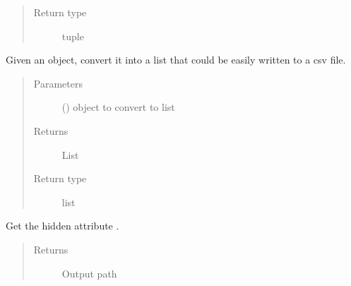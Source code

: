 \documentclass[letterpaper,10pt,english]{sphinxmanual}
\begin{document}
\begin{fulllineitems}
\begin{fulllineitems}
\begin{quote}
\begin{description}
\item[{Return type}] \leavevmode
tuple

\end{description}\end{quote}

\end{fulllineitems}


\begin{fulllineitems}
\label{\detokenize{polo.utils:polo.utils.io_utils.RunCsvWriter.image_to_row}}
Given an  object, convert it into a list that could be
easily written to a csv file.
\begin{quote}\begin{description}
\item[{Parameters}] \leavevmode
{} ({\hyperref[\detokenize{polo.crystallography:polo.crystallography.image.Image}]{}}) \textendash{}  object to convert to list

\item[{Returns}] \leavevmode
List

\item[{Return type}] \leavevmode
list

\end{description}\end{quote}

\end{fulllineitems}


\begin{fulllineitems}
\label{\detokenize{polo.utils:polo.utils.io_utils.RunCsvWriter.output_path}}
Get the hidden attribute .
\begin{quote}\begin{description}
\item[{Returns}] \leavevmode
Output path


\end{description}
\end{quote}
\end{fulllineitems}
\end{fulllineitems}
\end{document}
